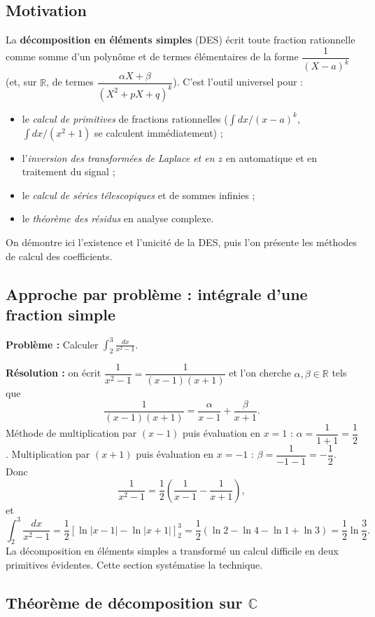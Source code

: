 \documentclass[12pt,a4paper]{report}
\theoremstyle{definition}
\theoremstyle{remark}
\begin{document}
\subsection{Motivation}
La \textbf{décomposition en éléments simples} (DES) écrit toute fraction rationnelle comme somme d'un polynôme et de termes élémentaires de la forme $\dfrac{1}{(X - a)^k}$ (et, sur $\mathbb{R}$, de termes $\dfrac{\alpha X + \beta}{(X^2 + pX + q)^k}$). C'est l'outil universel pour :
\begin{itemize}
    \item le \emph{calcul de primitives} de fractions rationnelles ($\int dx / (x - a)^k$, $\int dx / (x^2 + 1)$ se calculent immédiatement) ;
    \item l'\emph{inversion des transformées de Laplace et en $z$} en automatique et en traitement du signal ;
    \item le \emph{calcul de séries télescopiques} et de sommes infinies ;
    \item le \emph{théorème des résidus} en analyse complexe.
\end{itemize}
On démontre ici l'existence et l'unicité de la DES, puis l'on présente les méthodes de calcul des coefficients.

\subsection{Approche par problème : intégrale d'une fraction simple}
\textbf{Problème :} Calculer $\displaystyle \int_2^3 \frac{dx}{x^2 - 1}$.

\textbf{Résolution :} on écrit $\dfrac{1}{x^2 - 1} = \dfrac{1}{(x - 1)(x + 1)}$ et l'on cherche $\alpha, \beta \in \mathbb{R}$ tels que
\[ \frac{1}{(x - 1)(x + 1)} = \frac{\alpha}{x - 1} + \frac{\beta}{x + 1}. \]
Méthode de multiplication par $(x - 1)$ puis évaluation en $x = 1$ : $\alpha = \dfrac{1}{1 + 1} = \dfrac{1}{2}$.
Multiplication par $(x + 1)$ puis évaluation en $x = -1$ : $\beta = \dfrac{1}{-1 - 1} = -\dfrac{1}{2}$.
Donc
\[ \frac{1}{x^2 - 1} = \frac{1}{2} \left( \frac{1}{x - 1} - \frac{1}{x + 1} \right), \]
et
\[ \int_2^3 \frac{dx}{x^2 - 1} = \frac{1}{2} \left[ \ln|x - 1| - \ln|x + 1| \right]_2^3 = \frac{1}{2} \left( \ln 2 - \ln 4 - \ln 1 + \ln 3 \right) = \frac{1}{2} \ln \frac{3}{2}. \]
La décomposition en éléments simples a transformé un calcul difficile en deux primitives évidentes. Cette section systématise la technique.

\subsection{Théorème de décomposition sur $\mathbb{C}$}
\end{document}

